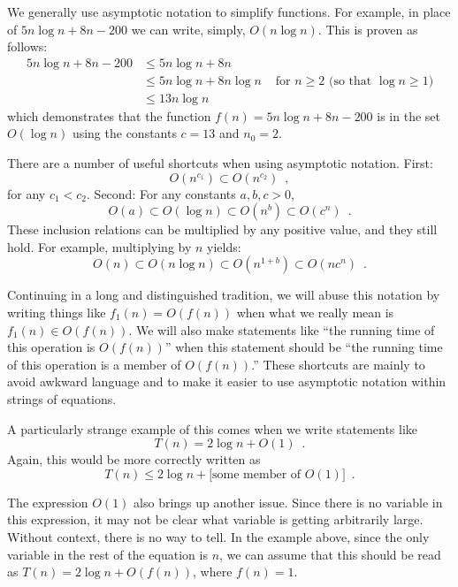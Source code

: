 We generally use asymptotic notation to simplify functions.  For example,
in place of $5n\log n + 8n - 200$ we can write, simply,  $O(n\log n)$.
This is proven as follows:
\begin{align*} 
       5n\log n + 8n - 200
        & \le 5n\log n + 8n \\
        & \le 5n\log n + 8n\log n & \mbox{ for $n\ge 2$ (so that $\log n \ge 1$)}
            \\
        & \le 13n\log n 
\end{align*}
which demonstrates that the function $f(n)=5n\log n + 8n - 200$ is in the set $O(\log n)$ using the constants $c=13$ and $n_0 = 2$.

There are a number of useful shortcuts when using asymptotic notation.  First:
\[ O(n^{c_1}) \subset O(n^{c_2}) \enspace ,\]
 for any $c_1 < c_2$.  Second:
For any constants $a,b,c > 0$,
\[ O(a) \subset O(\log n) \subset O(n^{b}) \subset O({c}^n) \enspace . \]
These inclusion relations can be multiplied by any positive value, and they still hold. For example, multiplying by $n$ yields:
\[ O(n) \subset O(n\log n) \subset O(n^{1+b}) \subset O(n{c}^n) \enspace . \]

Continuing in a long and distinguished tradition,
we will abuse this notation by writing things
like $f_1(n) = O(f(n))$ when what we really mean is $f_1(n) \in O(f(n))$.
We will also make statements like ``the running time of this operation
is $O(f(n))$'' when this statement should be ``the running time of
this operation is a member of $O(f(n))$.''  These shortcuts are mainly
to avoid awkward language and to make it easier to use asymptotic
notation within strings of equations.

A particularly strange example of this comes when we write statements like
\[
     T(n) = 2\log n + O(1)  \enspace .
\]
Again, this would be more correctly written as
\[
     T(n) \le 2\log n + [\mbox{some member of $O(1)$]}  \enspace .
\]

The expression $O(1)$ also brings up another issue. Since there is
no variable in this expression, it may not be clear what variable is
getting arbitrarily large.  Without context, there is no way to tell.
In the example above, since the only variable in the rest of the equation
is $n$, we can assume that this should be read as $T(n) = 2\log n + O(f(n))$,
where $f(n) = 1$.

